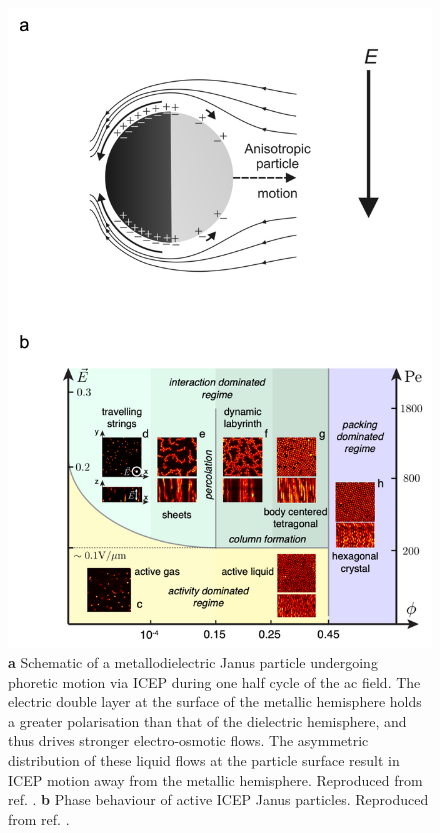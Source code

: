 \begin{figure}
    \centering
    \includegraphics[width=0.7\linewidth]{chapters/activeMatter/figsActiveMatter/figJanusPhaseDiagram}
    \caption[Janus particles and induced-charge electrophoresis.]{\textbf{a} Schematic of a metallodielectric Janus particle undergoing phoretic motion via ICEP during one half cycle of the ac field. The electric double layer at the surface of the metallic hemisphere holds a greater polarisation than that of the dielectric hemisphere, and thus drives stronger electro-osmotic flows. The asymmetric distribution of these liquid flows at the particle surface result in ICEP motion away from the metallic hemisphere. Reproduced from ref. \cite{gangwal2008}. \textbf{b} Phase behaviour of active ICEP Janus particles. Reproduced from ref.  \cite{sakai2020}.}
    \label{fig:janus_pd}
\end{figure}

